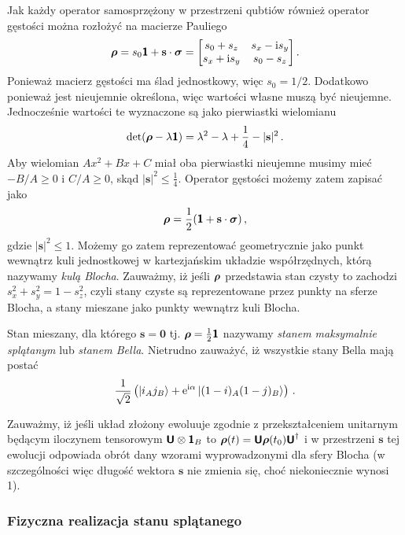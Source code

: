 \documentclass{myclass}
\begin{document}
Jak każdy operator samosprzężony w przestrzeni qubtiów również operator gęstości można rozłożyć na
macierze Pauliego
\begin{equation*}
    \oper{\rho} = s_0\oper{1} + \mathbf{s}\cdot\oper{\sigma} = \mqty[s_0 + s_z & s_x - \im s_y\\ s_x + \im s_y & s_0 - s_z]\,.
\end{equation*}
Ponieważ macierz gęstości ma ślad jednostkowy, więc \(s_0 = 1/2\). Dodatkowo ponieważ jest
nieujemnie określona, więc wartości własne muszą być nieujemne. Jednocześnie wartości te wyznaczone
są jako pierwiastki wielomianu
\begin{equation*}
    \det(\boldsymbol{\mathsf{\rho}} - \lambda\boldsymbol{\mathsf{1}}) = \lambda^2 - \lambda + \frac{1}{4} - |\mathbf{s}|^2\,.
\end{equation*}
Aby wielomian \(Ax^2 + Bx + C\) miał oba pierwiastki nieujemne musimy mieć \(-B/A \geq 0\) i \(C/A
\geq 0\), skąd \(|\mathbf{s}|^2 \leq \frac{1}{4}\). Operator gęstości możemy zatem zapisać jako
\begin{equation*}
    \boldsymbol{\mathsf{\rho}} = \frac{1}{2}(\boldsymbol{\mathsf{1}} + \mathbf{s}\cdot\boldsymbol{\mathsf{\sigma}})\,,
\end{equation*}
gdzie \(|\mathbf{s}|^2 \leq 1\). Możemy go zatem reprezentować geometrycznie jako punkt wewnątrz
kuli jednostkowej w kartezjańskim układzie współrzędnych, którą nazywamy \textit{kulą Blocha}.
Zauważmy, iż jeśli \(\boldsymbol{\mathsf{\rho}}\) przedstawia stan czysty to zachodzi \(s_x^2 + s_y^2 = 1 -
s_z^2\), czyli stany czyste są reprezentowane przez punkty na sferze Blocha, a stany mieszane jako
punkty wewnątrz kuli Blocha. 

Stan mieszany, dla którego \(\mathbf{s} = \mathbf{0}\) tj. \(\boldsymbol{\mathsf{\rho}} = \frac{1}{2}\boldsymbol{\mathsf{1}}\)
nazywamy \textit{stanem maksymalnie splątanym} lub \textit{stanem Bella}. Nietrudno zauważyć, iż
wszystkie stany Bella mają postać
\begin{equation*}
    \frac{1}{\sqrt{2}}\left(\ket{i_Aj_B} + \mathrm{e}^{\mathrm{i}\alpha}\ket{(1-i)_A(1-j)_B}\right)\,.
\end{equation*}

Zauważmy, iż jeśli układ złożony ewoluuje zgodnie z przekształceniem unitarnym będącym iloczynem
tensorowym \(\boldsymbol{\mathsf{U}}\otimes\boldsymbol{\mathsf{1}}_B\) to \(\boldsymbol{\mathsf{\rho}}(t) =
\boldsymbol{\mathsf{U}}\boldsymbol{\mathsf{\rho}}(t_0)\boldsymbol{\mathsf{U}}^\dagger\) i w przestrzeni \(\mathbf{s}\) tej ewolucji odpowiada
obrót dany wzorami wyprowadzonymi dla sfery Blocha (w szczególności więc długość wektora
\(\mathbf{s}\) nie zmienia się, choć niekoniecznie wynosi 1).


\subsubsection{Fizyczna realizacja stanu splątanego}
\end{document}
